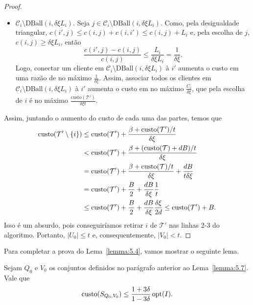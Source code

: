\begin{proof}
\begin{itemize}
        \item $\mathcal{C}_i \setminus \text{DBall}(i,\delta\xi L_i)$. Seja $j \in \mathcal{C}_i \setminus \text{DBall}(i,\delta\xi L_i)$. Como, pela desigualdade triangular, $c(i',j) \leq c(i,j) + c(i,i') \leq c(i,j) + L_i$ e, pela escolha de $j$, $c(i,j) \geq \delta\xi L_i$, então 
        \begin{equation}
            \frac{c(i',j) - c(i,j)}{ c(i,j)} \leq \frac{L_i}{\delta \xi L_i} = \frac{1}{\delta\xi}. \nonumber
        \end{equation}
        Logo, conectar um cliente em $\mathcal{C}_i \setminus \text{DBall}(i,\delta\xi L_i)$ à $i'$ aumenta o custo em uma razão de no máximo $\frac{1}{\delta\xi}$. Assim, associar todos os clientes em $\mathcal{C}_i \setminus \text{DBall}(i,\delta\xi L_i)$ à $i'$ aumenta o custo em no máximo $\frac{C_i}{\delta\xi}$, que pela escolha de $i$ é no máximo $\frac{\text{custo}(\mathcal{T}')}{\delta\xi t}$.
    \end{itemize}

    Assim, juntando o aumento do custo de cada uma das partes, temos que
    \begin{subequations}
        \begin{align*}
            \text{custo}(\mathcal{T}'\setminus\{i\}) &\leq \text{custo}(\mathcal{T}') + \frac{\beta + \text{custo}(\mathcal{T}')/t}{\delta\xi} \\
            &<\text{custo}(\mathcal{T}') + \frac{\beta + (\text{custo}(\mathcal{T}) + dB)/t}{\delta\xi} \\
            &=\text{custo} (\mathcal{T}') + \frac{\beta + \text{custo}(\mathcal{T})/t}{\delta\xi} + \frac{dB}{t\delta\xi} \\
            &=\text{custo} (\mathcal{T}') + \frac{B}{2} + \frac{dB}{\delta\xi} \frac{1}{t} \\
            &\leq \text{custo}(\mathcal{T}') + \frac{B}{2} + \frac{dB}{\delta\xi}\frac{\delta\xi}{2d} \leq \text{custo}(\mathcal{T}') + B.
        \end{align*}
    \end{subequations}
    Isso é um absurdo, pois conseguiríamos retirar $i$ de $\mathcal{T}'$ nas linhas 2-3 do algoritmo. Portanto, $|U_0| \leq t$ e, consequentemente, $|V_0| < t$.
\end{proof}
Para completar a prova do Lema~\ref{lemma:5.4}, vamos mostrar o seguinte lema.
\begin{lemma}
    Sejam $Q_0$ e $V_0$ os conjuntos definidos no parágrafo anterior ao Lema~\ref{lemma:5.7}. Vale que 
    \begin{equation}
        \text{custo}(S_{Q_0,V_0}) \leq \frac{1+3\delta}{1-3\delta}\,\mathrm{opt}(I). \nonumber
    \end{equation}
\end{lemma}
